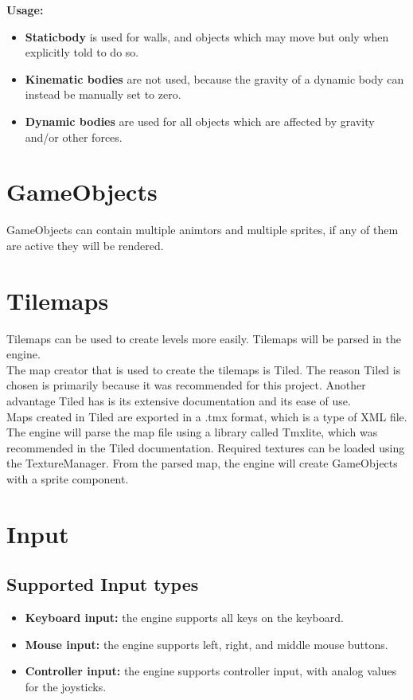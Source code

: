 \documentclass[draft]{article}
\begin{document}
\noindent
\textbf{Usage:}
\begin{itemize}
  \item \textbf{Staticbody} is used for walls, and objects which may move but only when explicitly told to do so.
  \item \textbf{Kinematic bodies} are not used, because the gravity of a dynamic body can instead be manually set to zero.
  \item \textbf{Dynamic bodies} are used for all objects which are affected by gravity and/or other forces.
\end{itemize}

\section{GameObjects}
GameObjects can contain multiple animtors and multiple sprites, if any of them are active they will be rendered.

\section{Tilemaps}
Tilemaps can be used to create levels more easily.
Tilemaps will be parsed in the engine.
\\
The map creator that is used to create the tilemaps is Tiled.
The reason Tiled is chosen is primarily because it was recommended for this project.
Another advantage Tiled has is its extensive documentation and its ease of use.
\\
Maps created in Tiled are exported in a .tmx format, which is a type of XML file.
The engine will parse the map file using a library called Tmxlite, which was recommended in the Tiled documentation.
Required textures can be loaded using the TextureManager.
From the parsed map, the engine will create GameObjects with a sprite component.

\section{Input}
\subsection{Supported Input types}
\begin{itemize}
  \item \textbf{Keyboard input:} the engine supports all keys on the keyboard.
  \item \textbf{Mouse input:} the engine supports left, right, and middle mouse buttons.
  \item \textbf{Controller input:} the engine supports controller input, with analog values for the joysticks.
\end{itemize}
\end{document}
